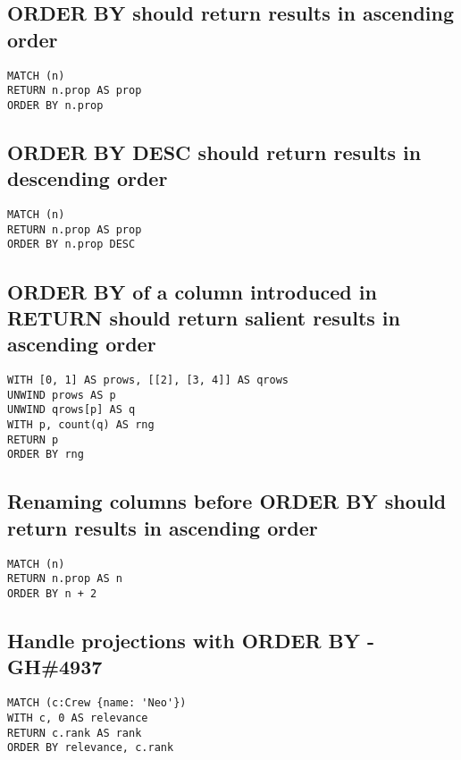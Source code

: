\begin{lstlisting}
\end{lstlisting}

\subsection{ORDER BY should return results in ascending order}

\begin{lstlisting}
MATCH (n)
RETURN n.prop AS prop
ORDER BY n.prop
\end{lstlisting}

\subsection{ORDER BY DESC should return results in descending order}

\begin{lstlisting}
MATCH (n)
RETURN n.prop AS prop
ORDER BY n.prop DESC
\end{lstlisting}

\subsection{ORDER BY of a column introduced in RETURN should return salient results in ascending order}

\begin{lstlisting}
WITH [0, 1] AS prows, [[2], [3, 4]] AS qrows
UNWIND prows AS p
UNWIND qrows[p] AS q
WITH p, count(q) AS rng
RETURN p
ORDER BY rng
\end{lstlisting}

\subsection{Renaming columns before ORDER BY should return results in ascending order}

\begin{lstlisting}
MATCH (n)
RETURN n.prop AS n
ORDER BY n + 2
\end{lstlisting}

\subsection{Handle projections with ORDER BY - GH\#4937}

\begin{lstlisting}
MATCH (c:Crew {name: 'Neo'})
WITH c, 0 AS relevance
RETURN c.rank AS rank
ORDER BY relevance, c.rank
\end{lstlisting}

